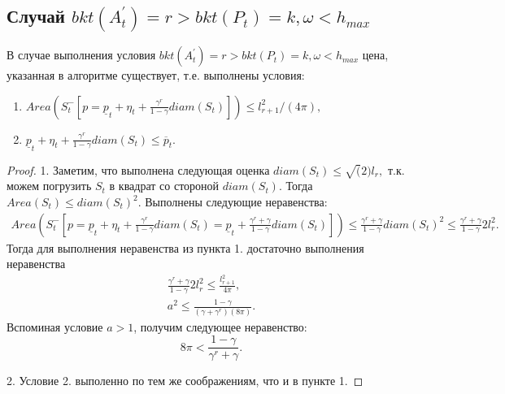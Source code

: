\documentclass[12 pt, russian]{article}
\begin{document}
\subsection{Случай $bkt(A^{'}_t) = r > bkt(P_t) = k, \omega < h_{max}$}
\statement
В случае выполнения условия $bkt(A^{'}_t) = r > bkt(P_t) = k, \omega < h_{max}$ цена, указанная в алгоритме существует, т.е. выполнены условия:
\begin{enumerate}
    \item $Area(S^{-}_t[p = \underline{p}_t + \eta_t + \frac{\gamma^r}{1 - \gamma}diam(S_t)]) \leq l^2_{r + 1} / (4 \pi),$
    \item $\underline{p}_t + \eta_t + \frac{\gamma^r}{1 - \gamma}diam(S_t) \leq \overline{p}_t.$
\end{enumerate}
\begin{proof}
1. Заметим, что выполнена следующая оценка $diam(S_t) \leq \sqrt(2) l_r,$ т.к. можем погрузить $S_t$ в квадрат со стороной $diam(S_t).$
Тогда $Area(S_t) \leq diam(S_t)^2.$
Выполнены следующие неравенства:
\begin{multline*}
    Area(S^{-}_t[p = \underline{p}_t + \eta_t + \frac{\gamma^r}{1 - \gamma}diam(S_t) = \underline{p}_t + \frac{\gamma^r + \gamma}{1 - \gamma}diam(S_t)]) \leq \frac{\gamma^r + \gamma}{1 - \gamma}diam(S_t)^2 \leq \frac{\gamma^r + \gamma}{1 - \gamma} 2 l^2_r.
\end{multline*}
Тогда для выполнения неравенства из пункта 1. достаточно выполнения неравенства 
\begin{gather*}
    \frac{\gamma^r + \gamma}{1 - \gamma} 2 l^2_r \leq \frac{l^2_{r + 1}}{4 \pi},\\
    a^2 \leq \frac{1 - \gamma}{(\gamma + \gamma^r)(8 \pi)}.
\end{gather*}
Вспоминая условие $a > 1$, получим следующее неравенство:
$$8 \pi < \frac{1 - \gamma}{\gamma^r + \gamma}.$$

2. Условие 2. выполенно по тем же соображениям, что и в пункте 1.
\end{proof}
\end{document}
